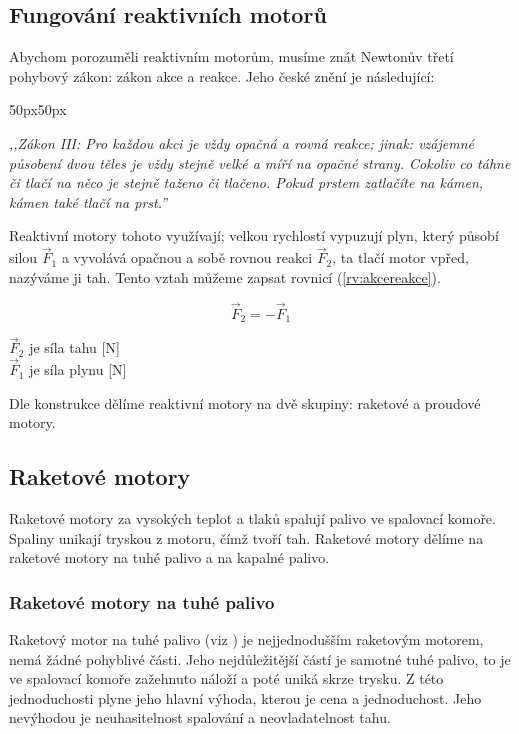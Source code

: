 \subsection{Fungování reaktivních motorů}\label{sc:AkceReakce}
{Abychom porozuměli reaktivním motorům, musíme znát Newtonův třetí pohybový zákon: zákon akce a reakce. Jeho české znění je následující:}
\cite{MIT:NewtonsLawsOfMotion}
\begin{changemargin}{50px}{50px}
    \begin{center}
        \textit{,,Zákon III: Pro každou akci je vždy opačná a rovná reakce; jinak: vzájemné působení dvou těles je vždy stejně velké a míří na opačné strany. Cokoliv co táhne či tlačí na něco je stejně taženo či tlačeno. Pokud prstem zatlačíte na kámen, kámen také tlačí na prst.''}
        \cite{MIT:NewtonsLawsOfMotion}
    \end{center}
\end{changemargin}
{Reaktivní motory tohoto využívají; velkou rychlostí vypuzují plyn, který působí silou \(\vec{F}_{1}\) a vyvolává opačnou a sobě rovnou reakci \(\vec{F}_{2}\), ta tlačí motor vpřed, nazýváme ji tah. Tento vztah můžeme zapsat rovnicí (\ref{rv:akcereakce}).}
\cite{MIT:NewtonsLawsOfMotion}

\begin{equation} \label{rv:akcereakce}
    \vec{F}_{2}=-\vec{F}_{1}
\end{equation}

{\(\vec{F}_{2}\) je síla tahu [N]}\\
{\(\vec{F}_{1}\) je síla plynu [N]}\odst

{Dle konstrukce dělíme reaktivní motory na dvě skupiny: raketové a proudové motory.}
\cite{VUTB:PrehledTechnickychAspektuVyvojeLeteckychProudovychMotoru}

\newpage

\subsection{Raketové motory}
{Raketové motory za vysokých teplot a tlaků spalují palivo ve spalovací komoře. Spaliny unikají tryskou z motoru, čímž tvoří tah.}
\cite{VUTB:NavrhRaketovehoMotoru}\odst
{Raketové motory dělíme na raketové motory na tuhé palivo a na kapalné palivo.}
\cite{VUTB:NavrhRaketovehoMotoru}

\subsubsection{Raketové motory na tuhé palivo}
{Raketový motor na tuhé palivo (viz ) je nejjednodušším raketovým motorem, nemá žádné pohyblivé části. Jeho nejdůležitější částí je samotné tuhé palivo, to je ve spalovací komoře zažehnuto náloží a poté uniká skrze trysku. Z této jednoduchosti plyne jeho hlavní výhoda, kterou je cena a jednoduchost. Jeho nevýhodou je neuhasitelnost spalování a neovladatelnost tahu.}
\cite{VUTB:NavrhRaketovehoMotoru}



